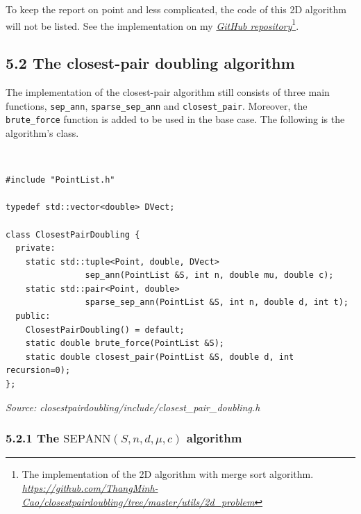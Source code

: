 \documentclass[12pt,english,]{article}
\newcommand{\code}[1]{\colorbox{light-gray}{\texttt{#1}}}
\newcommand{\pnt}[1]{{\scriptstyle#1}}
\begin{document}
To keep the report on point and less complicated, the code of this 2D
algorithm will not be listed. See the implementation on my
\href{https://github.com/ThangMinhCao/closestpairdoubling/tree/master/utils/2d_problem}{\emph{GitHub
repository}}\footnote{The implementation of the 2D algorithm with merge
  sort algorithm.
  \href{https://github.com/ThangMinhCao/closestpairdoubling/tree/master/utils/2d_problem}{\emph{https://github.com/ThangMinh-}
  \emph{Cao/closestpairdoubling/tree/master/utils/2d\_problem}}}.

\hypertarget{section5.2}{%
\subsection{5.2 The closest-pair doubling algorithm}\label{section5.2}}

The implementation of the closest-pair algorithm still consists of three
main functions, \code{sep\_ann}, \code{sparse\_sep\_ann} and
\code{closest\_pair}. Moreover, the \code{brute\_force} function is
added to be used in the base case. The following is the algorithm's
class.

~

\begin{lstlisting}
#include "PointList.h"

typedef std::vector<double> DVect;

class ClosestPairDoubling {
  private:
    static std::tuple<Point, double, DVect>
                sep_ann(PointList &S, int n, double mu, double c);
    static std::pair<Point, double>
                sparse_sep_ann(PointList &S, int n, double d, int t);
  public:
    ClosestPairDoubling() = default;
    static double brute_force(PointList &S);
    static double closest_pair(PointList &S, double d, int recursion=0);
};
\end{lstlisting}
\vspace{-9truemm}
\begin{minipage}{1\textwidth}
  \begin{flushright}
  {\footnotesize \emph{Source: closestpairdoubling/include/closest\_pair\_doubling.h}\par}
  \end{flushright}
\end{minipage}

\hypertarget{section5.2.1}{%
\subsubsection{\texorpdfstring{5.2.1 The
\(\mathrm{S\pnt{EP}A\pnt{NN}}(S,n,d,\mu,c)\)
algorithm}{5.2.1 The \textbackslash{}mathrm\{S\textbackslash{}pnt\{EP\}A\textbackslash{}pnt\{NN\}\}(S,n,d,\textbackslash{}mu,c) algorithm}}\label{section5.2.1}}
\end{document}
